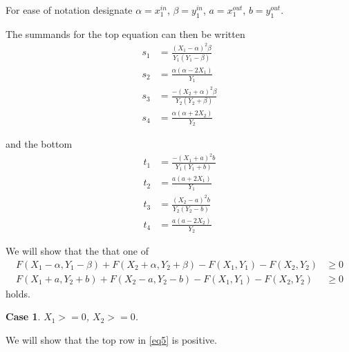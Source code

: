 \documentclass{article}
\theoremstyle{case}
\newtheorem{case}{Case}
\begin{document}
For ease of notation designate $\alpha = x_1^{in}$, $\beta = y_1^{in}$, $a = x_1^{out}$, $b = y_1^{out}$.

The summands for the top equation can then be written
\begin{align*}
s_1 & = \frac{\left(X_1 - \alpha\right)^2\beta}{Y_1\left( Y_1 - \beta\right)} \\
s_2 & = \frac{\alpha \left( \alpha - 2X_1\right)}{Y_1} \\
s_3 & = \frac{-\left( X_2 + \alpha\right)^2\beta}{Y_2\left( Y_2 + \beta\right)} \\
s_4 & = \frac{\alpha\left( \alpha + 2X_2\right)}{Y_2}
\end{align*}

and the bottom
\begin{align*}
t_1 & = \frac{-\left( X_1 + a\right)^2 b}{Y_1\left( Y_1 + b\right)} \\
t_2 & = \frac{a\left( a + 2X_1\right)}{Y_1} \\
t_3 & = \frac{\left( X_2 - a\right)^2b}{Y_2\left( Y_2 - b\right)} \\
t_4 & = \frac{a\left( a - 2X_2\right)}{Y_2}
\end{align*}

We will show that the that one of
\begin{align} \label{eq5}
F(X_1 - \alpha, Y_1 - \beta) + F(X_2 + \alpha, Y_2 + \beta) - F(X_1, Y_1) - F(X_2, Y_2) & \geq 0 \\
F(X_1 + a, Y_2 +b) + F(X_2 - a, Y_2 - b) - F(X_1, Y_1) - F(X_2, Y_2) & \geq 0
\end{align}
holds.


\begin{case} 
$X_1 >= 0$, $X_2 >= 0$. 
\end{case}
We will show that the top row in \ref{eq5} is positive.

\vspace{12pt}
\end{document}
